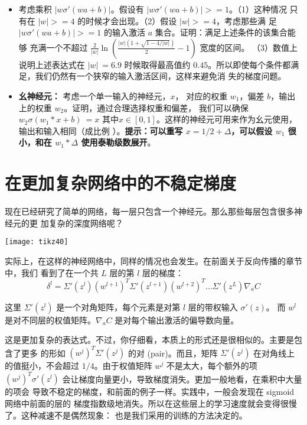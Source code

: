 \begin{itemize}
\item 考虑乘积 $|w\sigma'(wa+b)|$。假设有 $|w\sigma'(wa+b)| >= 1$。（1）这种情况
  只有在 $|w| >= 4$ 的时候才会出现。（2）假设 $|w| >= 4$，考虑那些满
  足 $|w\sigma'(wa+b)| >= 1$ 的输入激活 $a$ 集合。证明：满足上述条件的该集合能够
  充满一个不超过 $\frac{2}{|w|}\ln(\frac{|w|(1+\sqrt{1-4/|w|})}{2}-1)$ 宽度的区间。
  （3）数值上说明上述表达式在 $|w| ~= 6.9$ 时候取得最高值约
  $0.45$。所以即使每个条件都满足，我们仍然有一个狭窄的输入激活区间，这样来避免消
  失的梯度问题。
\item \textbf{幺神经元：}\label{identity_neuron} 考虑一个单一输入的神经元，$x$，
  对应的权重 $w_1$，偏差 $b$，输出上的权重 $w_2$。证明，通过合理选择权重和偏差，
  我们可以确保 $w_2 \sigma(w_1*x +b)~=x$
  其中$x \in [0, 1]$。这样的神经元可用来作为幺元使用，输出和输入相同（成比例
  ）。\textbf{提示：可以重写 $x = 1/2 + \Delta$，可以假设 $w_1$ 很小，和在 $w_1 *
    \Delta$ 使用泰勒级数展开}。
\end{itemize}

\section{在更加复杂网络中的不稳定梯度}

现在已经研究了简单的网络，每一层只包含一个神经元。那么那些每层包含很多神经元的更
加复杂的深度网络呢？
\begin{center}
  \texttt{[image: tikz40]}
\end{center}
 
实际上，在这样的神经网络中，同样的情况也会发生。在前面关于反向传播的章节中，我们
看到了在一个共 $L$ 层的第 $l$ 层的梯度：
\begin{equation}
  \delta^l = \Sigma'(z^l) (w^{l+1})^T \Sigma'(z^{l+1}) (w^{l+2})^T \ldots
  \Sigma'(z^L) \nabla_a C
  \label{eq:124}\tag{124}
\end{equation}

这里 $\Sigma'(z^l)$ 是一个对角矩阵，每个元素是对第 $l$ 层的带权输入 $\sigma'(z)$。
而 $w^l$ 是对不同层的权值矩阵。$\nabla_{a} C$ 是对每个输出激活的偏导数向量。
 
这是更加复杂的表达式。不过，你仔细看，本质上的形式还是很相似的。主要是包含了更多
的形如 $(w^j)^T \Sigma' (z^j)$ 的对 (pair)。而且，矩阵 $\Sigma'(z^j)$ 在对角线上
的值挺小，不会超过 $1/4$。由于权值矩阵 $w^j$ 不是太大，每个额外的项 $(w^j)^T
\sigma' (z^l)$ 会让梯度向量更小，导致梯度消失。更加一般地看，在乘积中大量的项会
导致不稳定的梯度，和前面的例子一样。实践中，一般会发现在 sigmoid网络中前面的层的
梯度指数级地消失。所以在这些层上的学习速度就会变得很慢了。这种减速不是偶然现象：
也是我们采用的训练的方法决定的。

